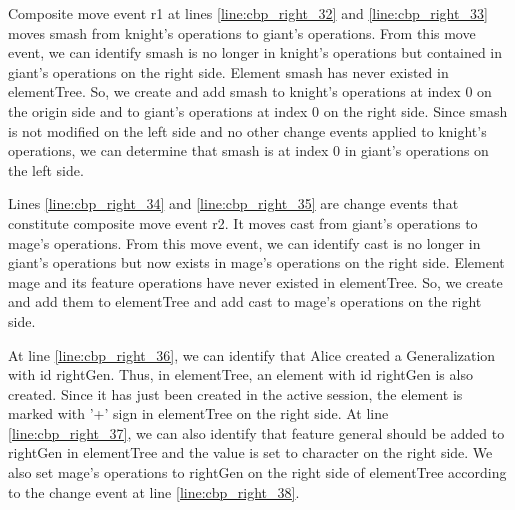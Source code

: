 Composite move event \textsf{r1} at lines \ref{line:cbp_right_32} and \ref{line:cbp_right_33} moves \textsf{smash} from \textsf{knight}'s \textsf{operations} to \textsf{giant}'s \textsf{operations}. From this move event, we can identify \textsf{smash} is no longer in \textsf{knight}'s \textsf{operations} but contained in \textsf{giant}'s \textsf{operations} on the right side. Element \textsf{smash} has never existed in \textsf{elementTree}. So, we create and add \textsf{smash} to \textsf{knight}'s \textsf{operations} at index 0 on the origin side and to \textsf{giant}'s \textsf{operations} at index 0 on the right side. Since \textsf{smash} is not modified on the left side and no other change events applied to \textsf{knight}'s \textsf{operations}, we can determine that \textsf{smash} is at index 0 in \textsf{giant}'s \textsf{operations} on the left side.

Lines \ref{line:cbp_right_34} and \ref{line:cbp_right_35} are change events that constitute composite move event \textsf{r2}.  It  moves \textsf{cast} from \textsf{giant}'s \textsf{operations} to \textsf{mage}'s \textsf{operations}. From this move event, we can identify \textsf{cast} is no longer in  \textsf{giant}'s \textsf{operations} but now exists in \textsf{mage}'s \textsf{operations} on the right side. Element \textsf{mage} and its feature \textsf{operations} have never existed in \textsf{elementTree}. So, we create and add them to \textsf{elementTree} and add \textsf{cast} to \textsf{mage}'s \textsf{operations} on the right side.

At line \ref{line:cbp_right_36}, we can identify that Alice created a \textsf{Generalization} with id \textsf{rightGen}. Thus, in \textsf{elementTree}, an element with id \textsf{rightGen} is also created. Since it has just been created in the active session, the element is marked with '+' sign in \textsf{elementTree} on the right side. At line \ref{line:cbp_right_37}, we can also identify that feature \textsf{general} should be added to \textsf{rightGen} in \textsf{elementTree} and the value is set to \textsf{character} on the right side. We also set \textsf{mage}'s \textsf{operations} to \textsf{rightGen} on the right side of  \textsf{elementTree} according to the change event at line \ref{line:cbp_right_38}. 

